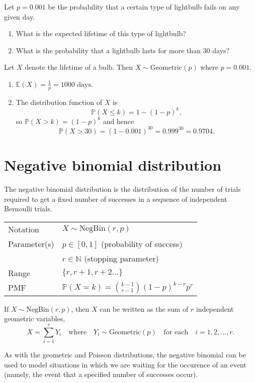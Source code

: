 \documentclass[lecture]{csm}
\newcommand{\prob}{\mathbb{P}}
\newcommand{\expe}{\mathbb{E}}
\newcommand{\N}{\mathbb{N}}
\def\it{\item}
\def\ben{\begin{enumerate}}
\def\een{\end{enumerate}}
\begin{document}
\begin{example}
Let $p=0.001$ be the probability that a certain type of lightbulb fails on any given day. 
\ben
\it What is the expected lifetime of this type of lightbulb?
\it What is the probability that a lightbulb lasts for more than 30 days?
\een
\end{example}

\begin{solution}
Let $X$ denote the lifetime of a bulb. Then $X\sim\text{Geometric}(p)$ where $p=0.001$. 
\ben
\it $\expe(X) = \displaystyle\frac{1}{p} = 1000\text{ days}$.
\it The distribution function of $X$ is 
\[
\prob(X\leq k) = 1-(1-p)^k,
\]
so $\prob(X> k) = (1-p)^k$ and hence
\[
\prob(X > 30) = (1 - 0.001)^{30} = 0.999^{30} = 0.9704.
\]
\een
\end{solution}


\newpage
\section{Negative binomial distribution}
The negative binomial distribution is the distribution of the number of trials required to get a fixed number of successes in a sequence of independent Bernoulli trials. 

\begin{center}
\begin{tabular}{ll}\hline
Notation			& $X\sim\text{NegBin}(r,p)$ \\
Parameter(s)		& $p \in[0,1]$ \quad (probability of success) \\
				& $r \in\N$ \qquad (stopping parameter) \\
Range			& $\{r,r+1,r+2\ldots\}$ \\[1ex]
PMF				& $\prob(X=k) = \displaystyle \binom{k-1}{r-1}(1-p)^{k-r}p^{r}$\\[2ex] \hline
\end{tabular}
\end{center}

If $X\sim\text{NegBin}(r,p)$, then $X$ can be written as the sum of $r$ independent geometric variables,
\[
X = \sum_{i=1}^r Y_i \quad\text{where}\quad Y_i\sim\text{Geometric}(p)\quad\text{for each}\quad i=1,2,\ldots,r.
\]

\begin{remark}
As with the geometric and Poisson distributions, the negative binomial can be used to model situations in which we are waiting for the occurence of an event (namely, the event that a specified number of successes occur).
\end{remark}
\end{document}
